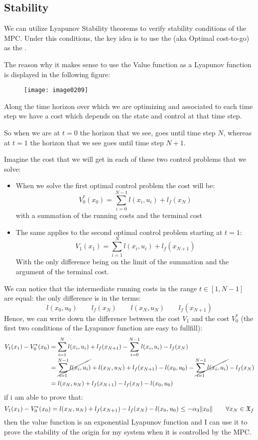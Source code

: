 \subsection{Stability}
We can utilize Lyapunov Stability theorems to verify stability conditions of the MPC. Under this conditions, the key idea is to use the  (aka Optimal cost-to-go) as the .

The reason why it makes sense to use the Value function as a Lyapunov function is displayed in the following figure:
\begin{figure}[!h]
\centering
\texttt{[image: image0209]}
\end{figure}
Along the time horizon over which we are optimizing and associated to each time step we have a cost which depends on the state and control at that time step.

So when we are at $t=0$ the horizon that we see, goes until time step $N$, whereas at $t=1$ the horizon that we see goes until time step $N+1$.

Imagine the cost that we will get in each of these two control problems that we solve:
\begin{itemize}
\item When we solve the first optimal control problem the cost will be:
\[V_0^*(x_0) = \sum_{i=0}^{N-1} l(x_i,u_i) + l_f(x_N)\]
with a summation of the running costs and the terminal cost
\item The same applies to the second optimal control problem starting at $t=1$:
\[V_1(x_1) = \sum_{i=1}^{N} l(x_i, u_i) + l_f(x_{N+1})\]
With the only difference being on the limit of the summation and the argument of the terminal cost.
\end{itemize}


We can notice that the intermediate running costs in the range $t\in[1,N-1]$ are equal: the only difference is in the terms:
\[l(x_0,u_0)\qquad l_f(x_N) \qquad l(x_N, u_N)\qquad l_f(x_{N+1})\]
Hence, we can write down the difference between the cost $V_1$ and the cost $V_0^*$ (the first two conditions of the Lyapunov function are easy to fullfill):
\begin{align*}
V_1(x_1) - V_0^*(x_0) &= \sum_{i=1}^{N}l(x_i,u_i) + l_f(x_{N+1}) - \sum_{i=0}^{N-1}l(x_i,u_i) - l_f(x_N)\\
&= \cancel{\sum_{i=1}^{N-1} l(x_i,u_i)} + l(x_N, u_N) + l_f(x_{N+1}) - l(x_0,u_0) - \cancel{\sum_{i=1}^{N-1} l(x_i,u_i)} - l_f(x_N)\\
&= l(x_N, u_N) + l_f(x_{N+1}) - l_f(x_N) - l(x_0, u_0)
\end{align*}
if i am able to prove that:
\[V_1(x_1) - V_0^*(x_0)  = l(x_N, u_N) + l_f(x_{N+1}) - l_f(x_N) - l(x_0, u_0) \le -\alpha_3 \lVert x_0\rVert\qquad \forall x_N\in\mathfrak{X}_f\]
then the value function is an exponential Lyapunov function and I can use it to prove the stability of the origin for my system when it is controlled by the MPC.

